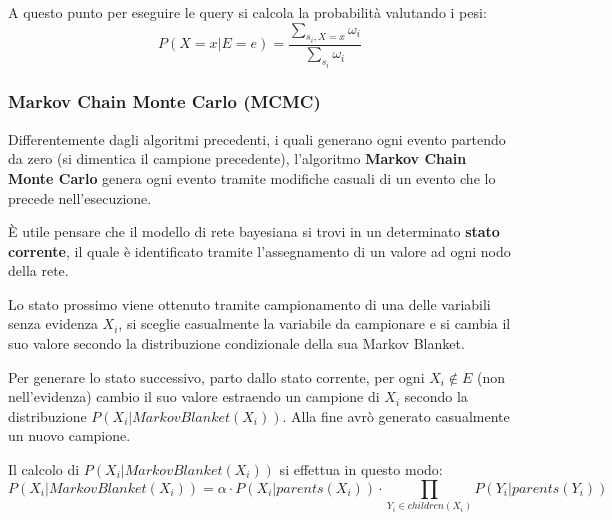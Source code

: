 A questo punto per eseguire le query si calcola la probabilità valutando i pesi:
\begin{equation*}
    P(X = x | E = e) = \frac{\sum_{s_i, X=x} \omega_i}{\sum_{s_i} \omega_i}
\end{equation*}
\subsubsection{Markov Chain Monte Carlo (MCMC)}
Differentemente dagli algoritmi precedenti, i quali generano ogni evento partendo
da zero (si dimentica il campione precedente), l'algoritmo \textbf{Markov Chain Monte Carlo}
genera ogni evento tramite modifiche casuali di un evento che lo precede nell'esecuzione.

È utile pensare che il modello di rete bayesiana si trovi in un determinato
\textbf{stato corrente}, il quale è identificato tramite l'assegnamento di un
valore ad ogni nodo della rete.

Lo stato prossimo viene ottenuto tramite campionamento di una delle variabili
senza evidenza $X_i$, si sceglie casualmente la variabile da campionare e si
cambia il suo valore secondo la distribuzione condizionale della sua Markov Blanket.

Per generare lo stato successivo, parto dallo stato corrente, per ogni $X_i \not \in E$
(non nell'evidenza) cambio il suo valore estraendo un campione di $X_i$ secondo
la distribuzione $P(X_i | MarkovBlanket(X_i))$. Alla fine avrò generato casualmente
un nuovo campione.

Il calcolo di $P(X_i | MarkovBlanket(X_i))$ si effettua in questo modo:
\begin{equation}
    P(X_i | MarkovBlanket(X_i)) = \alpha \cdot P(X_i | parents(X_i)) \cdot
    \prod_{Y_i\in children(X_i)} P(Y_i| parents(Y_i))
\end{equation}
